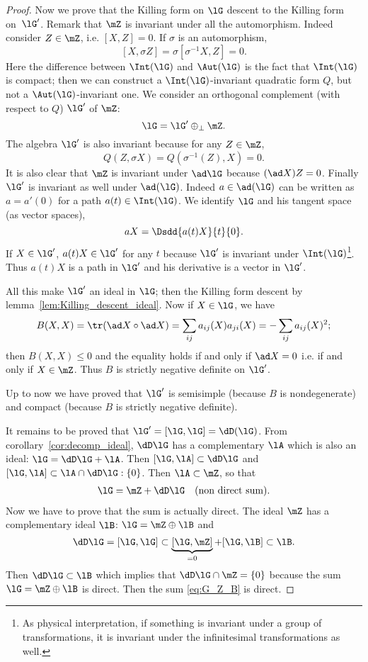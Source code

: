 \begin{proof}
Now we prove that the Killing form on $\lG$ descent to the Killing form on~$\lG'$. Remark that $\mZ$ is invariant under all the automorphism. Indeed consider $Z\in\mZ$, i.e.  $[X,Z]=0$. If $\sigma$ is an automorphism,
\[
   [X,\sigma Z]=\sigma[\sigma^{-1} X,Z]=0.
\]
Here the difference between $\Int(\lG)$ and $\Aut(\lG)$ is the fact that $\Int(\lG)$ is compact; then we can construct a $\Int(\lG)$-invariant quadratic form $Q$, but not a $\Aut(\lG)$-invariant one. We consider an orthogonal complement (with respect to $Q$) $\lG'$ of $\mZ$:
\begin{equation}
   \lG=\lG'\oplus_{\perp}\mZ.
\end{equation}
The algebra $\lG'$ is also invariant because for any $Z\in\mZ$,
\[
Q(Z,\sigma X)=Q(\sigma^{-1}(Z),X)=0.
\]
It is also clear that $\mZ$ is invariant under $\ad\lG$ because $(\ad X)Z=0$. Finally $\lG'$ is invariant as well under $\ad(\lG)$. Indeed $a\in\ad(\lG)$ can be written as $a=a'(0)$ for a path $a(t)\in\Int(\lG)$. We identify $\lG$ and his tangent space (as vector spaces),
\[
  aX=\Dsdd{ a(t)X }{t}{0}.
\]
If $X\in\lG'$, $a(t)X\in\lG'$ for any $t$ because $\lG'$ is invariant under $\Int(\lG)$\footnote{As physical interpretation, if something is invariant under a group of transformations, it is invariant under the infinitesimal transformations as well.}. Thus $a(t)X$ is a path in $\lG'$ and his derivative is a vector in $\lG'$.

All this make $\lG'$ an ideal in $\lG$; then the Killing form descent by lemma~\ref{lem:Killing_descent_ideal}. Now if $X\in\lG$, we have
\begin{equation}
  B(X,X)=\tr(\ad X\circ\ad X)
        =\sum_{ij}a_{ij}(X)a_{ji}(X)
    =-\sum_{ij}a_{ij}(X)^2;
\end{equation}
then $B(X,X)\leq 0$ and the equality holds if and only if $\ad X=0$ i.e. if and only if $X\in\mZ$. Thus $B$ is strictly negative definite on $\lG'$.

Up to now we have proved that $\lG'$ is semisimple (because $B$ is nondegenerate) and compact (because $B$ is strictly negative definite).

It remains to be proved that $\lG'=[\lG,\lG]=\dD(\lG)$. From corollary~\ref{cor:decomp_ideal}, $\dD\lG$ has a complementary $\lA$ which is also an ideal: $\lG=\dD\lG+\lA$. Then $[\lG,\lA]\subset\dD\lG$ and $[\lG,\lA]\subset\lA\cap\dD\lG:\{0\}$. Then $\lA\subset\mZ$, so that
\begin{align}\label{eq:G_Z_B}
   \lG=\mZ+\dD\lG&&\text{(non direct sum)}.
\end{align}
Now we have to prove that the sum is actually direct. The ideal $\mZ$ has a complementary ideal $\lB$: $\lG=\mZ\oplus\lB$ and
\[
   \dD\lG=[\lG,\lG]\subset\underbrace{[\lG,\mZ]}_{=0}+[\lG,\lB]\subset\lB.
\]
Then $\dD\lG\subset\lB$ which implies that $\dD\lG\cap\mZ=\{0\}$ because the sum $\lG=\mZ\oplus\lB$ is direct. Then the sum \eqref{eq:G_Z_B} is direct.

\end{proof}

